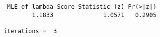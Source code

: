 \begin{verbatim} MLE of lambda Score Statistic (z) Pr(>|z|)
        1.1833              1.0571   0.2905

iterations =  3 
\end{verbatim}